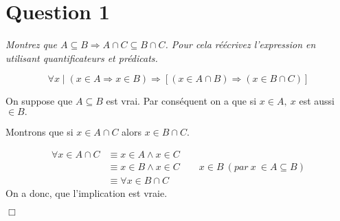 \section*{Question 1}
\emph{Montrez que \( A \subseteq B \Rightarrow A \cap C \subseteq B \cap C\). Pour cela réécrivez l’expression en utilisant quantificateurs et prédicats.}


\[\forall x \mid (x \in A \Rightarrow x \in B) \Rightarrow [(x \in A \cap B) \Rightarrow (x \in B \cap C)]\]

\bigskip
On suppose que $A \subseteq B$ est vrai. Par conséquent on a que si $x \in A,\ x$ est aussi $\in B.$
	
Montrons que si $x \in A \cap C$ alors $x \in B \cap C$.

\begin{align*}
	\forall x \in A \cap C &\equiv x \in A \wedge x \in C\\
	&\equiv x \in B \wedge x \in C \qquad x \in B\ (par\ x\ \in A \subseteq B)\\
	&\equiv \forall x \in B \cap C
\end{align*}
\smallskip
On a donc, que l'implication est vraie.
\begin{flushright}
	$\Box$
\end{flushright}
